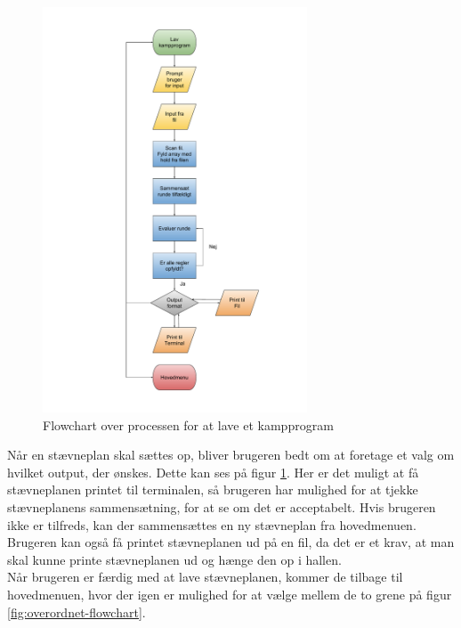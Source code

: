 \begin{figure}[H]
  \centering
  \includegraphics[width=0.7\textwidth]{figures/Lavflowchart.pdf}
  \caption{Flowchart over processen for at lave et kampprogram}
  \label{fig:lav-flowchart}
\end{figure}

Når en stævneplan skal sættes op, bliver brugeren bedt om at foretage et valg om hvilket output, der ønskes. Dette kan ses på figur \ref{fig:lav-flowchart}. Her er det muligt at få stævneplanen printet til terminalen, så brugeren har mulighed for at tjekke stævneplanens sammensætning, for at se om det er acceptabelt. Hvis brugeren ikke er tilfreds, kan der sammensættes en ny stævneplan fra hovedmenuen. Brugeren kan også få printet stævneplanen ud på en fil, da det er et krav, at man skal kunne printe stævneplanen ud og hænge den op i hallen.\\
Når brugeren er færdig med at lave stævneplanen, kommer de tilbage til hovedmenuen, hvor der igen er mulighed for at vælge mellem de to grene på figur \ref{fig:overordnet-flowchart}.

